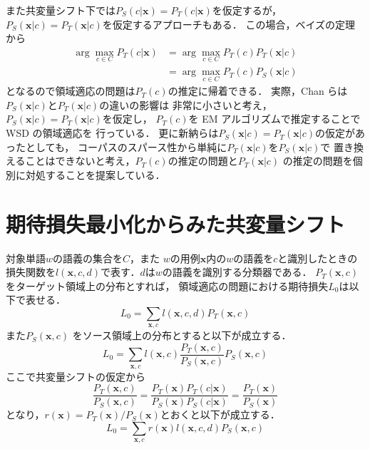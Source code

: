 \documentclass[japanese]{jnlp_1.4}
\begin{document}
また共変量シフト下では\( P_S(c|\boldsymbol{x}) = P_T(c|\boldsymbol{x}) \)を仮定するが，
\( P_S(\boldsymbol{x}|c) = P_T(\boldsymbol{x}|c) \)を仮定するアプローチもある．
この場合，ベイズの定理から
\begin{align*}
\arg \max_{c \in C} P_T (c|\boldsymbol{x}) & = \arg \max_{c \in C} P_T(c) P_T(\boldsymbol{x}|c) \\
                                   & = \arg \max_{c \in C} P_T(c) P_S(\boldsymbol{x}|c) 
\end{align*}
となるので領域適応の問題は\( P_T(c) \)の推定に帰着できる．
実際，Chan らは\( P_S (\boldsymbol{x}|c) \)と\( P_T (\boldsymbol{x}|c)\)の違いの影響は
非常に小さいと考え，\( P_S (\boldsymbol{x}|c) = P_T (\boldsymbol{x}|c)\)を仮定し，
\( P_T (c)\)を EM アルゴリズムで推定することで WSD の領域適応を
行っている\cite{chan2005word,chan2006estimating}．
更に新納らは\( P_S(\boldsymbol{x}|c) = P_T(\boldsymbol{x}|c) \)の仮定があったとしても，
コーパスのスパース性から単純に\( P_T(\boldsymbol{x}|c) \)を\( P_S(\boldsymbol{x}|c) \)で
置き換えることはできないと考え，\( P_T (c)\)の推定の問題と\( P_T(\boldsymbol{x}|c) \)
の推定の問題を個別に対処することを提案している\cite{shinnou-gengo-13}．



\section{期待損失最小化からみた共変量シフト}


対象単語\( w \)の語義の集合を\( C \)，また
\( w \)の用例\( \boldsymbol{x} \)内の\( w \)の語義を\( c \)と識別したときの
損失関数を\( l(\boldsymbol{x},c,d) \)で表す．\( d \)は\( w \)の語義を識別する分類器である．
\( P_T(\boldsymbol{x},c) \) をターゲット領域上の分布とすれば，
領域適応の問題における期待損失\( L_0 \)は以下で表せる．
\[
L_0 = \sum_{\boldsymbol{x},c} l(\boldsymbol{x},c,d) P_T(\boldsymbol{x},c)
\]
また\( P_S(\boldsymbol{x},c) \) をソース領域上の分布とすると以下が成立する．
\[
L_0 = \sum_{\boldsymbol{x},c} l(\boldsymbol{x},c) \frac{P_T(\boldsymbol{x},c)}{P_S(\boldsymbol{x},c)} P_S(\boldsymbol{x},c)
\]
ここで共変量シフトの仮定から
\[
\frac{P_T(\boldsymbol{x},c)}{P_S(\boldsymbol{x},c)} = \frac{P_T(\boldsymbol{x})P_T(c|\boldsymbol{x})}{P_S(\boldsymbol{x})P_S(c|\boldsymbol{x})} = \frac{P_T(\boldsymbol{x})}{P_S(\boldsymbol{x})}
\]
となり，\( r(\boldsymbol{x}) = P_T(\boldsymbol{x})/P_S(\boldsymbol{x}) \)とおくと以下が成立する．
\[
L_0 = \sum_{\boldsymbol{x},c} r(\boldsymbol{x}) l(\boldsymbol{x},c,d) P_S(\boldsymbol{x},c)
\]
\end{document}
